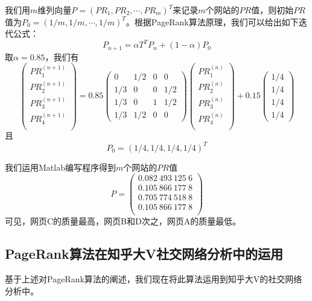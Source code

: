 \documentclass[a4paper]{article}
\begin{document}
\begin{spacing}{1.5}
我们用$m$维列向量$P=(PR_1,PR_2,\cdots,PR_m)^T$来记录$m$个网站的$PR$值，则初始$PR$值为$P_0=(1/m,1/m,\cdots,1/m)^T$。根据PageRank算法原理，我们可以给出如下迭代公式：
\[P_{n+1}=\alpha T^TP_n+(1-\alpha)P_0\]
取$\alpha=0.85$，我们有
\[\begin{pmatrix}
PR_1^{(n+1)}\\PR_2^{(n+1)}\\PR_3^{(n+1)}\\PR_4^{(n+1)}\\
\end{pmatrix}=0.85\begin{pmatrix}0&1/2&0&0\\
1/3&0&0&1/2\\
1/3&0&1&1/2\\
1/3&1/2&0&0\end{pmatrix}
\begin{pmatrix}
PR_1^{(n)}\\PR_2^{(n)}\\PR_3^{(n)}\\PR_4^{(n)}\\
\end{pmatrix}+0.15\begin{pmatrix}
1/4\\1/4\\1/4\\1/4
\end{pmatrix}\]
且
\[P_0=(1/4,1/4,1/4,1/4)^T\]

我们运用Matlab编写程序得到$m$个网站的$PR$值
\[P=\begin{pmatrix}
   0.082\ 493\ 125\ 6\\
   0.105\ 866\ 177\ 8\\
   0.705\ 774\ 518\ 8\\
   0.105\ 866\ 177\ 8\\
\end{pmatrix}\]
可见，网页C的质量最高，网页B和D次之，网页A的质量最低。

\subsection{PageRank算法在知乎大V社交网络分析中的运用}

基于上述对PageRank算法的阐述，我们现在将此算法运用到知乎大V的社交网络分析中。


\end{spacing}
\end{document}
